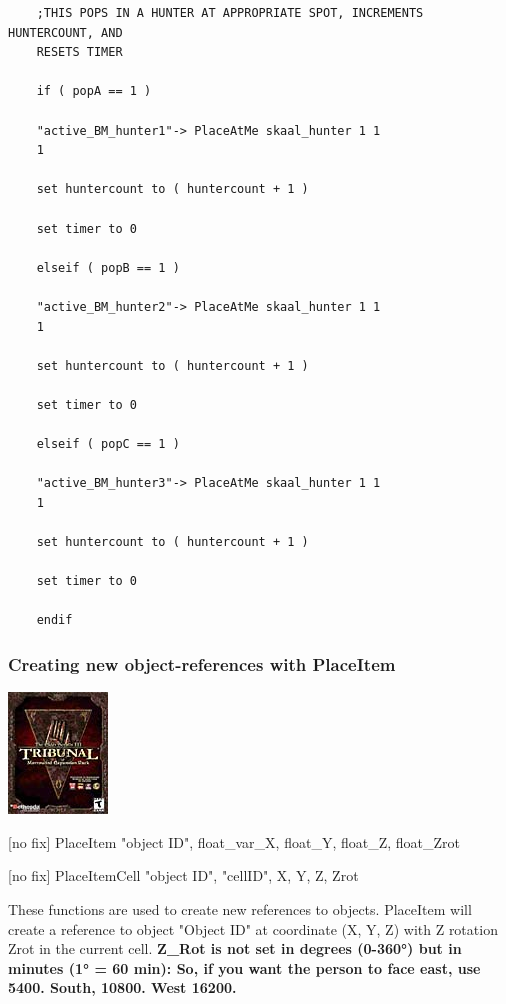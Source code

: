 \begin{lstlisting}
	;THIS POPS IN A HUNTER AT APPROPRIATE SPOT, INCREMENTS HUNTERCOUNT, AND
	RESETS TIMER
	
	if ( popA == 1 )
	
	"active_BM_hunter1"-> PlaceAtMe skaal_hunter 1 1
	1
	
	set huntercount to ( huntercount + 1 )
	
	set timer to 0
	
	elseif ( popB == 1 )
	
	"active_BM_hunter2"-> PlaceAtMe skaal_hunter 1 1
	1
	
	set huntercount to ( huntercount + 1 )
	
	set timer to 0
	
	elseif ( popC == 1 )
	
	"active_BM_hunter3"-> PlaceAtMe skaal_hunter 1 1
	1
	
	set huntercount to ( huntercount + 1 )
	
	set timer to 0
	
	endif
\end{lstlisting}

\hypertarget{creating-new-object-references-with-placeitem}{%
\subsubsection{Creating new object-references with
PlaceItem}\label{creating-new-object-references-with-placeitem}}

\includegraphics{media/image6.png}

{[}no fix{]} PlaceItem "object ID", float\_var\_X, float\_Y, float\_Z,
float\_Zrot

{[}no fix{]} PlaceItemCell "object ID", "cellID", X, Y, Z, Zrot


These functions are used to create new references to objects. PlaceItem
will create a reference to object "Object ID" at coordinate (X, Y, Z)
with Z rotation Zrot in the current cell. \textbf{Z\_Rot is not set in
degrees (0-360°) but in minutes (1° = 60 min): So, if you want the
person to face east, use 5400. South, 10800. West 16200.}

